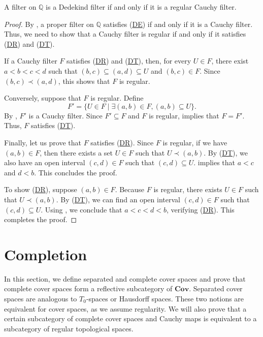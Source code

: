 \documentclass[pdflatex,sn-mathphys-num]{sn-jnl}
\newcommand{\axref}[1]{(\hyperref[ax:#1]{#1})}
\theoremstyle{definition}
\theoremstyle{remark}
\numberwithin{figure}{section}
\newcommand{\rb}{\prec}
\newcommand{\cat}[1]{\mathbf{#1}}
\begin{document}
\begin{prop}
A filter on $\mathbb{Q}$ is a Dedekind filter if and only if it is a regular Cauchy filter.
\end{prop}
\begin{proof}
By , a proper filter on $\mathbb{Q}$ satisfies \axref{DE} if and only if it is a Cauchy filter.
Thus, we need to show that a Cauchy filter is regular if and only if it satisfies \axref{DR} and \axref{DT}.

If a Cauchy filter $F$ satisfies \axref{DR} and \axref{DT}, then, for every $U \in F$, there exist $a < b < c < d$ such that $(b,c) \subseteq (a,d) \subseteq U$ and $(b,c) \in F$.
Since $(b,c) \rb (a,d)$, this shows that $F$ is regular.

Conversely, suppose that $F$ is regular.
Define
\[ F' = \{ U \in F \mid \exists (a,b) \in F, (a,b) \subseteq U \}. \]
By , $F'$ is a Cauchy filter.
Since $F' \subseteq F$ and $F$ is regular,  implies that $F = F'$.
Thus, $F$ satisfies \axref{DT}.

Finally, let us prove that $F$ satisfies \axref{DR}.
Since $F$ is regular, if we have $(a,b) \in F$, then there exists a set $U \in F$ such that $U \rb (a,b)$.
By \axref{DT}, we also have an open interval $(c,d) \in F$ such that $(c,d) \subseteq U$.
 implies that $a < c$ and $d < b$.
This concludes the proof.

To show \axref{DR}, suppose $(a,b) \in F$.
Because $F$ is regular, there exists $U \in F$ such that $U \rb (a,b)$.
By \axref{DT}, we can find an open interval $(c,d) \in F$ such that $(c,d) \subseteq U$.
Using , we conclude that $a < c < d < b$, verifying \axref{DR}.
This completes the proof.
\end{proof}

\section{Completion}
\label{sec:completion}

In this section, we define separated and complete cover spaces and prove that complete cover spaces form a reflective subcategory of $\cat{Cov}$.
Separated cover spaces are analogous to $T_0$-spaces or Hausdorff spaces.
These two notions are equivalent for cover spaces, as we assume regularity.
We will also prove that a certain subcategory of complete cover spaces and Cauchy maps is equivalent to a subcategory of regular topological spaces.
\end{document}
